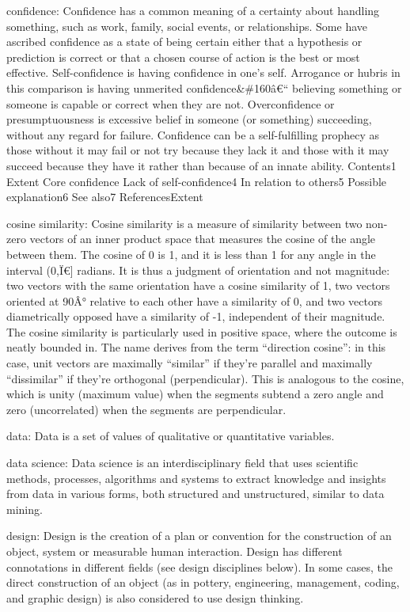 \documentclass[]{book}
\newcommand{\euro}{€}
\begin{document}
confidence: Confidence has a common meaning of a certainty about
handling something, such as work, family, social events, or
relationships. Some have ascribed confidence as a state of being certain
either that a hypothesis or prediction is correct or that a chosen
course of action is the best or most effective. Self-confidence is
having confidence in one's self. Arrogance or hubris in this comparison
is having unmerited confidence\&\#160â\euro{}`` believing something or
someone is capable or correct when they are not. Overconfidence or
presumptuousness is excessive belief in someone (or something)
succeeding, without any regard for failure. Confidence can be a
self-fulfilling prophecy as those without it may fail or not try because
they lack it and those with it may succeed because they have it rather
than because of an innate ability. Contents1 Extent Core confidence Lack
of self-confidence4 In relation to others5 Possible explanation6 See
also7 ReferencesExtent

cosine similarity: Cosine similarity is a measure of similarity between
two non-zero vectors of an inner product space that measures the cosine
of the angle between them. The cosine of 0 is 1, and it is less than 1
for any angle in the interval (0,Ï\euro{}{]} radians. It is thus a
judgment of orientation and not magnitude: two vectors with the same
orientation have a cosine similarity of 1, two vectors oriented at 90Â°
relative to each other have a similarity of 0, and two vectors
diametrically opposed have a similarity of -1, independent of their
magnitude. The cosine similarity is particularly used in positive space,
where the outcome is neatly bounded in. The name derives from the term
``direction cosine'': in this case, unit vectors are maximally
``similar'' if they're parallel and maximally ``dissimilar'' if they're
orthogonal (perpendicular). This is analogous to the cosine, which is
unity (maximum value) when the segments subtend a zero angle and zero
(uncorrelated) when the segments are perpendicular.

data: Data is a set of values of qualitative or quantitative variables.

data science: Data science is an interdisciplinary field that uses
scientific methods, processes, algorithms and systems to extract
knowledge and insights from data in various forms, both structured and
unstructured, similar to data mining.

design: Design is the creation of a plan or convention for the
construction of an object, system or measurable human interaction.
Design has different connotations in different fields (see design
disciplines below). In some cases, the direct construction of an object
(as in pottery, engineering, management, coding, and graphic design) is
also considered to use design thinking.
\end{document}
